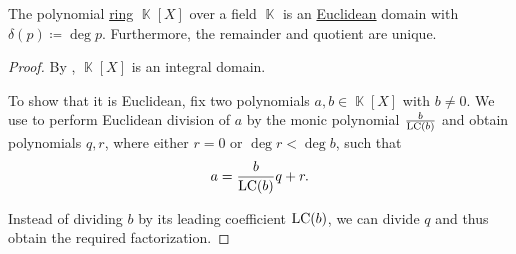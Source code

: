 \begin{corollary}\label{thm:polynomials_over_field_are_euclidean_domain}\mcite\cite[10]{Knapp2016BasicAlgebra}
  The polynomial \hyperref[def:semiring/integral_domain]{ring} \( \BbbK[X] \) over a field \( \BbbK \) is an \hyperref[def:semiring/euclidean_domain]{Euclidean} domain with \( \delta(p) \coloneqq \deg p \). Furthermore, the remainder and quotient are unique.
\end{corollary}
\begin{proof}
  By , \( \BbbK[X] \) is an integral domain.

  To show that it is Euclidean, fix two polynomials \( a, b \in \BbbK[X] \) with \( b \neq 0 \). We use  to perform Euclidean division of \( a \) by the monic polynomial \( \frac {b} {\operatorname{LC}(b)} \) and obtain polynomials \( q, r \), where either \( r = 0 \) or \( \deg r < \deg b \), such that
  \begin{equation*}
    a = \frac {b} {\operatorname{LC}(b)} q + r.
  \end{equation*}

  Instead of dividing \( b \) by its leading coefficient \( \operatorname{LC}(b) \), we can divide \( q \) and thus obtain the required factorization.
\end{proof}

